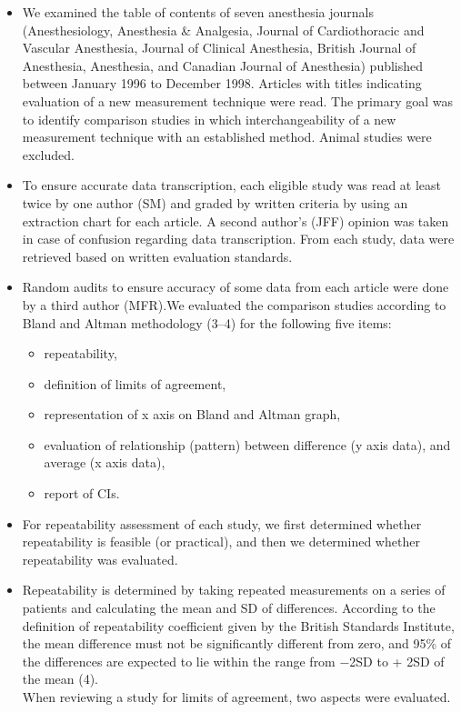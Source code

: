 \documentclass[]{article}
\begin{document}
	\begin{itemize}
		\item We examined the table of contents of seven anesthesia journals (Anesthesiology, Anesthesia \& Analgesia, Journal of Cardiothoracic and Vascular Anesthesia, Journal of Clinical Anesthesia, British Journal of Anesthesia, Anesthesia, and Canadian Journal of Anesthesia) published between January 1996 to December 1998. Articles with titles indicating evaluation of a new measurement technique were read. The primary goal was to identify comparison studies in which interchangeability of a new measurement technique with an established method. Animal studies were excluded. 
		\item To ensure accurate data transcription, each eligible study was read at least twice by one author (SM) and graded by written criteria by using an extraction chart for each article. A second author’s (JFF) opinion was taken in case of confusion regarding data transcription. From each study, data were retrieved based on written evaluation standards. 
		\item Random audits to ensure accuracy of some data from each article were done by a third author (MFR).We evaluated the comparison studies according to Bland and Altman methodology (3–4) for the following five items: 
		\begin{itemize}
			\item repeatability, 
			\item definition of limits of agreement, 
			\item representation of x axis on Bland and Altman graph, 
			\item evaluation of relationship (pattern) between difference (y axis data), and average (x axis data), 
			\item report of CIs. 
		\end{itemize}
		\item For repeatability assessment of each study, we first determined whether repeatability is feasible (or practical), and then we determined whether repeatability was evaluated. 
		\item Repeatability is determined by taking repeated measurements on a series of patients and calculating the mean and SD of differences. According to the definition of repeatability coefficient given by the British Standards Institute, the mean difference must not be significantly different from zero, and 95\% of the differences are expected to lie within the range from −2SD to + 2SD of the mean (4). \\ When reviewing a study for limits of agreement, two aspects were evaluated. 
		

\end{itemize}
\end{document}
